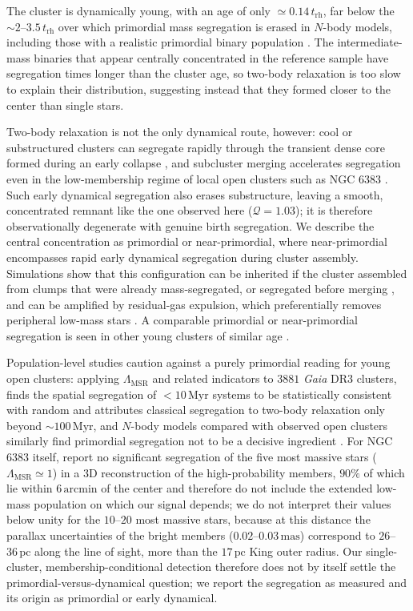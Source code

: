 \documentclass{aa}
\begin{document}
The cluster is dynamically young, with an age of only $\simeq0.14\,t_{\mathrm{rh}}$, far below the $\sim2$--$3.5\,t_{\mathrm{rh}}$ over which primordial mass segregation is erased in $N$-body models, including those with a realistic primordial binary population \citep{2020A&A...638A.155P}. The intermediate-mass binaries that appear centrally concentrated in the reference sample have segregation times longer than the cluster age, so two-body relaxation is too slow to explain their distribution, suggesting instead that they formed closer to the center than single stars.

Two-body relaxation is not the only dynamical route, however: cool or substructured clusters can segregate rapidly through the transient dense core formed during an early collapse \citep{2009ApJ...700L..99A}, and subcluster merging accelerates segregation even in the low-membership regime of local open clusters such as NGC 6383 \citep{2009MNRAS.400..657M}. Such early dynamical segregation also erases substructure, leaving a smooth, concentrated remnant like the one observed here ($\mathcal{Q}=1.03$); it is therefore observationally degenerate with genuine birth segregation. We describe the central concentration as primordial or near-primordial, where near-primordial encompasses rapid early dynamical segregation during cluster assembly. Simulations show that this configuration can be inherited if the cluster assembled from clumps that were already mass-segregated, or segregated before merging \citep{2007ApJ...655L..45M}, and can be amplified by residual-gas expulsion, which preferentially removes peripheral low-mass stars \citep{2007MNRAS.380.1589B}. A comparable primordial or near-primordial segregation is seen in other young clusters of similar age \citep{2007AJ....134.1368C,2008AJ....135..173S}.

Population-level studies caution against a purely primordial reading for young open clusters: applying $\Lambda_{\mathrm{MSR}}$ and related indicators to $3881$ \textit{Gaia} DR3 clusters, \citet{2026AJ....171..236Z} finds the spatial segregation of $<10\,\mathrm{Myr}$ systems to be statistically consistent with random and attributes classical segregation to two-body relaxation only beyond $\sim100\,\mathrm{Myr}$, and $N$-body models compared with observed open clusters similarly find primordial segregation not to be a decisive ingredient \citep{2026arXiv260604509A}. For NGC 6383 itself, \citet{2026AJ....172...85Z} report no significant segregation of the five most massive stars ($\Lambda_{\mathrm{MSR}}\simeq1$) in a 3D reconstruction of the high-probability \citet{2024arXiv240305143H} members, $90\%$ of which lie within $6\,\mathrm{arcmin}$ of the center and therefore do not include the extended low-mass population on which our signal depends; we do not interpret their values below unity for the $10$--$20$ most massive stars, because at this distance the parallax uncertainties of the bright members ($0.02$--$0.03\,\mathrm{mas}$) correspond to $26$--$36\,\mathrm{pc}$ along the line of sight, more than the $17\,\mathrm{pc}$ King outer radius. Our single-cluster, membership-conditional detection therefore does not by itself settle the primordial-versus-dynamical question; we report the segregation as measured and its origin as primordial or early dynamical.
\end{document}
